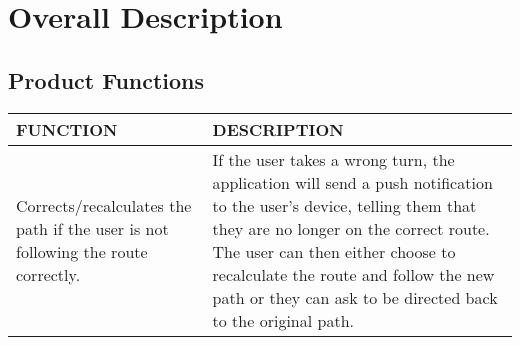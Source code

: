 \documentclass[a4paper,12pt]{article}
\begin{document}
	\newpage
	\section{Overall Description}
	\subsection{Product Functions}
		\begin{table}[!htbp]
			\centering
			\footnotesize
			\label{tab:table 2.2}
			\bgroup
			\def\arraystretch{1.3}
			\begin{tabular}{|L|L|}
				\hline
				FUNCTION & DESCRIPTION 
				\\
				\hline
				Corrects/recalculates the path if the user
				 is not following the route correctly. & If the user takes a wrong turn, the application will send a push notification to the user’s device, telling them that they are no longer on the correct route. The user can then either choose to recalculate the route and follow the new path or they can ask to be directed back to the original path.
				 

\end{tabular}
\end{table}
\end{document}
